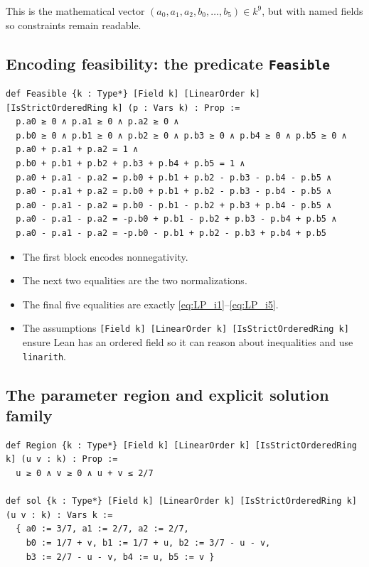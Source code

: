 \documentclass[11pt]{article}
\begin{document}
This is the mathematical vector $(a_0,a_1,a_2,b_0,\dots,b_5)\in k^9$, but with named fields so constraints remain readable.

\subsection{Encoding feasibility: the predicate \texttt{Feasible}}

\begin{lstlisting}
def Feasible {k : Type*} [Field k] [LinearOrder k] [IsStrictOrderedRing k] (p : Vars k) : Prop :=
  p.a0 ≥ 0 ∧ p.a1 ≥ 0 ∧ p.a2 ≥ 0 ∧
  p.b0 ≥ 0 ∧ p.b1 ≥ 0 ∧ p.b2 ≥ 0 ∧ p.b3 ≥ 0 ∧ p.b4 ≥ 0 ∧ p.b5 ≥ 0 ∧
  p.a0 + p.a1 + p.a2 = 1 ∧
  p.b0 + p.b1 + p.b2 + p.b3 + p.b4 + p.b5 = 1 ∧
  p.a0 + p.a1 - p.a2 = p.b0 + p.b1 + p.b2 - p.b3 - p.b4 - p.b5 ∧
  p.a0 - p.a1 + p.a2 = p.b0 + p.b1 + p.b2 - p.b3 - p.b4 - p.b5 ∧
  p.a0 - p.a1 - p.a2 = p.b0 - p.b1 - p.b2 + p.b3 + p.b4 - p.b5 ∧
  p.a0 - p.a1 - p.a2 = -p.b0 + p.b1 - p.b2 + p.b3 - p.b4 + p.b5 ∧
  p.a0 - p.a1 - p.a2 = -p.b0 - p.b1 + p.b2 - p.b3 + p.b4 + p.b5
\end{lstlisting}

\begin{itemize}
\item The first block encodes nonnegativity.
\item The next two equalities are the two normalizations.
\item The final five equalities are exactly \eqref{eq:LP_i1}--\eqref{eq:LP_i5}.
\item The assumptions \texttt{[Field k] [LinearOrder k] [IsStrictOrderedRing k]} ensure Lean has an ordered field so it can reason about inequalities and use \texttt{linarith}.
\end{itemize}

\subsection{The parameter region and explicit solution family}

\begin{lstlisting}
def Region {k : Type*} [Field k] [LinearOrder k] [IsStrictOrderedRing k] (u v : k) : Prop :=
  u ≥ 0 ∧ v ≥ 0 ∧ u + v ≤ 2/7

def sol {k : Type*} [Field k] [LinearOrder k] [IsStrictOrderedRing k] (u v : k) : Vars k :=
  { a0 := 3/7, a1 := 2/7, a2 := 2/7,
    b0 := 1/7 + v, b1 := 1/7 + u, b2 := 3/7 - u - v,
    b3 := 2/7 - u - v, b4 := u, b5 := v }
\end{lstlisting}
\end{document}
